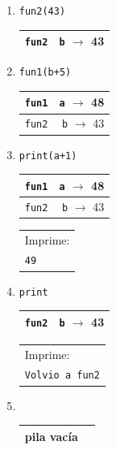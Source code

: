 \begin{enumerate}

\item  \verb|fun2(43)  | \hspace{1.5cm}
	\begin{tabular}{r|r|}
	\hline
	\currentframe \verb|fun2|&\verb|b| $\rightarrow$ 43\\
	\hline
	\end{tabular}

\item  \verb|fun1(b+5) | \hspace{1.5cm}
	\begin{tabular}{r|r|}
	\hline
	\currentframe \verb|fun1|&\verb|a| $\rightarrow$ 48\\
	\hline
	\hline
	\verb|fun2|&\verb|b| $\rightarrow$ 43\\
	\hline
	\end{tabular}

\item  \verb|print(a+1)| \hspace{1.5cm}
	\begin{tabular}{r|r|}
	\hline
	\currentframe \verb|fun1|&\verb|a| $\rightarrow$ 48\\
	\hline
	\hline
	\verb|fun2|&\verb|b| $\rightarrow$ 43\\
	\hline
	\end{tabular}
	\hspace{1cm}
	\begin{tabular}{l}
	Imprime: \\
	{\small\tt 49}
	\end{tabular}

\item  \verb|print     | \hspace{1.5cm}
	\begin{tabular}{r|r|}
	\hline
	\currentframe \verb|fun2|&\verb|b| $\rightarrow$ 43\\
	\hline
	\end{tabular}
	\hspace{1cm}
	\begin{tabular}{l}
	Imprime: \\
	{\small\tt Volvio a fun2}
	\end{tabular}

\item  \verb|          | \hspace{1.5cm}
	\begin{tabular}{r|r|}
	\hline
	\currentframe pila vacía\\
	\hline
	\end{tabular}

\end{enumerate}

